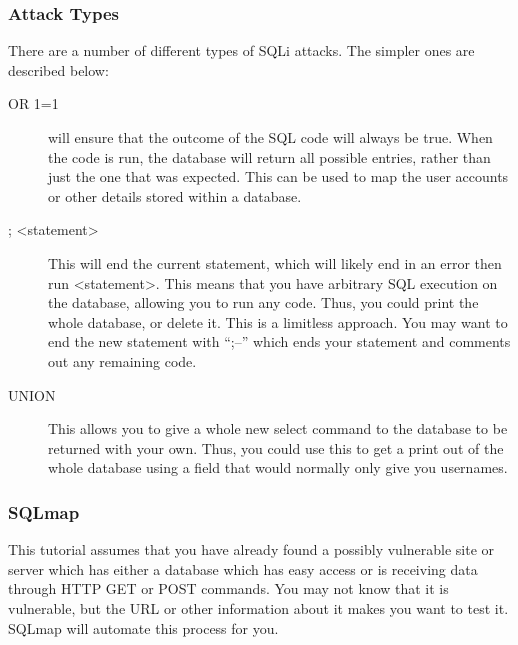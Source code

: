 		\subsubsection{Attack Types}
			There are a number of different types of SQLi attacks.
			The simpler ones are described below:
			\begin{description}
				\item[OR 1=1] will ensure that the outcome of the SQL code will always be true.
					When the code is run, the database will return all possible entries, rather than just the one that was expected.
					This can be used to map the user accounts or other details stored within a database.
				\item[; <statement>] This will end the current statement, which will likely end in an error then run <statement>.
					This means that you have arbitrary SQL execution on the database, allowing you to run any code.
					Thus, you could print the whole database, or delete it.
					This is a limitless approach.
					You may want to end the new statement with ``;--'' which ends your statement and comments out any remaining code.
				\item[UNION] This allows you to give a whole new select command to the database to be returned with your own.
					Thus, you could use this to get a print out of the whole database using a field that would normally only give you usernames.

			\end{description}
		\subsubsection{SQLmap}
			This tutorial assumes that you have already found a possibly vulnerable site or server which has either a database which has easy access or is receiving data through HTTP GET or POST commands.
			You may not know that it is vulnerable, but the URL or other information about it makes you want to test it.
			SQLmap will automate this process for you.

